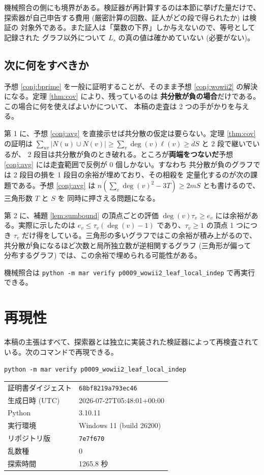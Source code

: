 \documentclass[paper=a4,fontsize=10.5pt,jafontsize=10.5pt]{jlreq}
\theoremstyle{plain}
\theoremstyle{definition}
\begin{document}
機械照合の側にも境界がある。検証器が再計算するのは本節に挙げた量だけで、
探索器が自己申告する費用 (厳密計算の回数、証人がどの段で得られたか) は検証の
対象外である。また証人は「葉数の下界」しか与えないので、等号として記録された
グラフ以外について $L_s$ の真の値は確かめていない (必要がない)。

\subsection*{次に何をすべきか}

予想 \ref{conj:bprime} を一般に証明することが、そのまま予想
\ref{conj:wowii2} の解決になる。定理 \ref{thm:cov} により、残っているのは
\textbf{共分散が負の場合}だけである。この場合に何を使えばよいかについて、
本稿の走査は 2 つの手がかりを与える。

第 1 に、予想 \ref{conj:avg} を直接示せば共分散の仮定は要らない。定理
\ref{thm:cov} の証明は $\sum_{uv} |N(u) \cup N(v)| \ge
\sum_v \deg(v)\ell(v) \ge \overline{d} S$ と 2 段で継いでいるが、
2 段目は共分散が負のとき破れる。ところが\textbf{両端をつないだ}予想
\ref{conj:avg} には走査範囲で反例が 0 個しかない。すなわち
共分散が負のグラフでは 2 段目の損を 1 段目の余裕が埋めており、その相殺を
定量化するのが次の課題である。予想 \ref{conj:avg} は
$n(\sum_v \deg(v)^2 - 3T) \ge 2mS$ とも書けるので、三角形数 $T$ と $S$ を
同時に押さえる問題になる。

第 2 に、補題 \ref{lem:sumbound} の頂点ごとの評価
$\deg(v)\tau_v \ge e_v$ には余裕がある。実際に示したのは
$e_v \le \tau_v(\deg(v) - 1)$ であり、$\tau_v \ge 1$ の頂点 1 つにつき
$\tau_v$ だけ得をしている。三角形の多いグラフではこの余裕が積み上がるので、
共分散が負になるほど次数と局所独立数が逆相関するグラフ (三角形が偏って
分布するグラフ) では、この余裕で埋められる可能性がある。

\medskip
\noindent
機械照合は \texttt{python -m mar verify p0009\_wowii2\_leaf\_local\_indep} で再実行できる。


\section*{再現性}
本稿の主張はすべて、探索器とは独立に実装された検証器によって再検査されている。次のコマンドで再現できる。

\begin{center}\texttt{python -m mar verify p0009\_wowii2\_leaf\_local\_indep}\end{center}

\begin{center}\begin{tabular}{ll}\toprule
証明書ダイジェスト & \texttt{68bf8219a793ec46} \\
生成日時 (UTC) & 2026-07-27T05:48:01+00:00 \\
Python & 3.10.11 \\
実行環境 & Windows 11 (build 26200) \\
リポジトリ版 & \texttt{7e7f670} \\
乱数種 & 0 \\
探索時間 & 1265.8 秒 \\
\bottomrule\end{tabular}\end{center}
\end{document}
